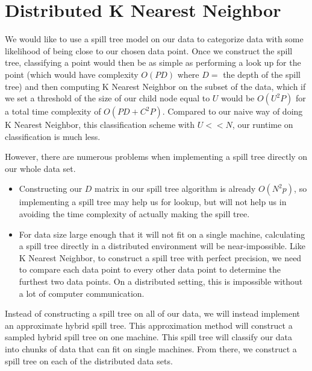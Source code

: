 \section{Distributed K Nearest Neighbor}

\vspace{5 mm}
\noindent
We would like to use a spill tree model on our data to categorize data with 
some likelihood of being close to our chosen data point. Once we 
construct the spill tree, classifying a point would then be as simple as 
performing a look up for the point (which would have complexity $O(P D)$ where 
$D = $ the depth of the spill tree) and then computing K Nearest Neighbor on 
the subset of the data, which if we set a threshold of the size of our child 
node equal to $U$ would be $O(U^{2} P)$ for a total time complexity of 
$O(P D + C^{2} P)$. Compared to our naive way of doing K Nearest Neighbor, 
this classification scheme with $U << N$, our runtime on classification is much 
less.

\vspace{5 mm}
\noindent
However, there are numerous problems when implementing a spill tree directly 
on our whole data set.

\begin{itemize}
\item Constructing our $D$ matrix in our spill tree algorithm is already  
$O(N^{2} p)$, so implementing a spill tree may help us for lookup, but will not 
help us in avoiding the time complexity of actually making the spill tree.
\item For data size large enough that it will not fit on a single machine, 
calculating a spill tree directly in a distributed environment will be 
near-impossible. Like K Nearest Neighbor, to construct a spill tree with 
perfect precision, we need to compare each data point to every other data 
point to determine the furthest two data points. On a distributed setting, this 
is impossible without a lot of computer communication.
\end{itemize}

\vspace{5 mm}
\noindent
Instead of constructing a spill tree on all of our data, we will instead 
implement an approximate hybrid spill tree. This approximation method will 
construct a sampled hybrid spill tree on one machine. This spill tree will 
classify our data into chunks of data that can fit on single machines. From 
there, we construct a spill tree on each of the distributed data sets.

